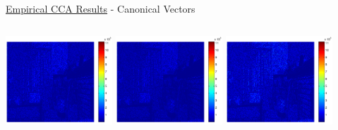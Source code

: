 \documentclass[8pt]{beamer}
\begin{document}
\begin{frame}{\href{run:/home/asendorf/Documents/thesis_videos/flashing_cca.mp4}{Empirical
      CCA Results} -
    Canonical Vectors}
\begin{columns}
\begin{column}{0.9\textwidth}
\begin{center}
        \includegraphics[width=0.3\textwidth]{figures/flashing_cca_wy1.pdf}\hspace{1ex}
        \includegraphics[width=0.3\textwidth]{figures/flashing_cca_wy2.pdf}\hspace{1ex}
        \includegraphics[width=0.3\textwidth]{figures/flashing_cca_wy3.pdf}
      \end{center}
    \end{column}
  \end{columns}

\end{frame}
\end{document}
